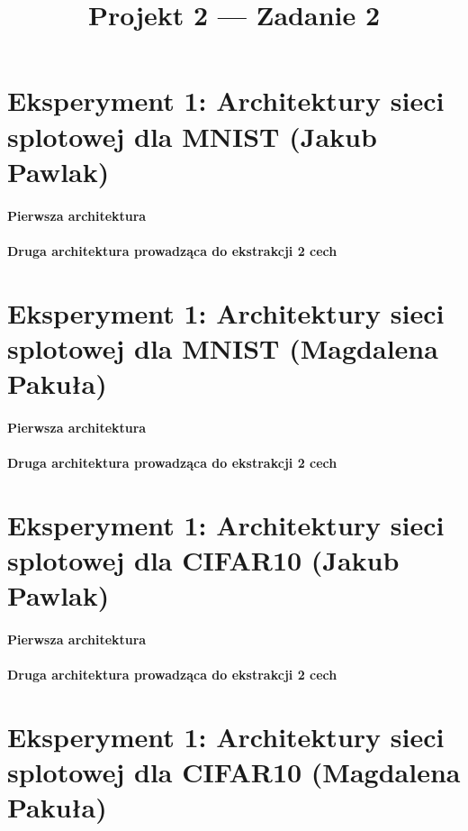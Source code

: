 \documentclass[10pt]{article}
\title{Projekt 2 --- Zadanie 2}
\begin{document}
\maketitle
\normalsize

\section{Eksperyment 1: Architektury sieci splotowej dla MNIST (Jakub Pawlak)}\label{sec:ex1-pawlak_mnist}

\paragraph{Pierwsza architektura}
\paragraph{Druga architektura prowadząca do ekstrakcji 2 cech}

\pagebreak
\section{Eksperyment 1: Architektury sieci splotowej dla MNIST (Magdalena Pakuła)}\label{sec:ex1-pakula_mnist}

\paragraph{Pierwsza architektura}
\paragraph{Druga architektura prowadząca do ekstrakcji 2 cech}

\pagebreak
\section{Eksperyment 1: Architektury sieci splotowej dla CIFAR10 (Jakub Pawlak)}\label{sec:ex1-pawlak_cifar}

\paragraph{Pierwsza architektura}
\paragraph{Druga architektura prowadząca do ekstrakcji 2 cech}

\pagebreak
\section{Eksperyment 1: Architektury sieci splotowej dla CIFAR10 (Magdalena Pakuła)}\label{sec:ex1-pakula_cifar}
\end{document}
